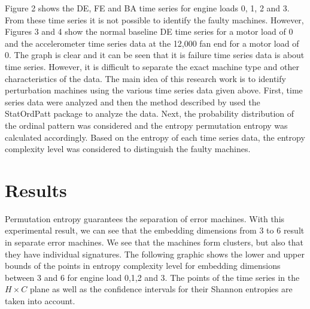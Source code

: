 \documentclass[sn-basic,pdflatex]{sn-jnl}
\theoremstyle{remark}
\theoremstyle{definition}
\begin{document}
Figure 2 shows the DE, FE and BA time series for engine loads 0, 1, 2
and 3. From these time series it is not possible to identify the faulty
machines. However, Figures 3 and 4 show the normal baseline DE time
series for a motor load of 0 and the accelerometer time series data at
the 12,000 fan end for a motor load of 0. The graph is clear and it can
be seen that it is failure time series data is about time series.
However, it is difficult to separate the exact machine type and other
characteristics of the data. The main idea of this research work is to
identify perturbation machines using the various time series data given
above. First, time series data were analyzed and then the method
described by \citet{REY2024115481} used the StatOrdPatt package to
analyze the data. Next, the probability distribution of the ordinal
pattern was considered and the entropy permutation entropy was
calculated accordingly. Based on the entropy of each time series data,
the entropy complexity level was considered to distinguish the faulty
machines.

\section{Results}\label{Results}

Permutation entropy guarantees the separation of error machines. With
this experimental result, we can see that the embedding dimensions from
3 to 6 result in separate error machines. We see that the machines form
clusters, but also that they have individual signatures. The following
graphic shows the lower and upper bounds of the points in entropy
complexity level for embedding dimensions between 3 and 6 for engine
load 0,1,2 and 3. The points of the time series in the \(H×C\) plane as
well as the confidence intervals for their Shannon entropies are taken
into account.


\end{document}
